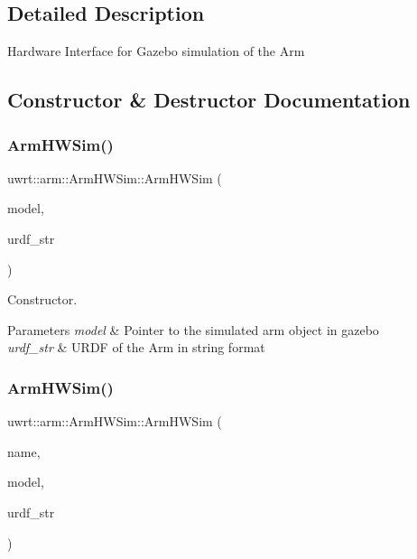 \subsection{Detailed Description}
Hardware Interface for Gazebo simulation of the Arm 

\subsection{Constructor \& Destructor Documentation}
\mbox{\label{classuwrt_1_1arm_1_1_arm_h_w_sim_aaa787422131f1db3f639e5905545a839}} 
\subsubsection{\texorpdfstring{Arm\+H\+W\+Sim()}{ArmHWSim()}\hspace{0.1cm}{\footnotesize\ttfamily [1/2]}}
{\footnotesize\ttfamily uwrt\+::arm\+::\+Arm\+H\+W\+Sim\+::\+Arm\+H\+W\+Sim (\begin{DoxyParamCaption}\item[{gazebo\+::physics\+::\+Model\+Ptr}]{model,  }\item[{const std\+::string \&}]{urdf\+\_\+str }\end{DoxyParamCaption})}



Constructor. 


\begin{DoxyParams}{Parameters}
{\em model} & Pointer to the simulated arm object in gazebo \\
\hline
{\em urdf\+\_\+str} & U\+R\+DF of the Arm in string format \\
\hline
\end{DoxyParams}
\mbox{\label{classuwrt_1_1arm_1_1_arm_h_w_sim_ac0764d307f3b885dccc49c36545dfcd3}} 
\subsubsection{\texorpdfstring{Arm\+H\+W\+Sim()}{ArmHWSim()}\hspace{0.1cm}{\footnotesize\ttfamily [2/2]}}
{\footnotesize\ttfamily uwrt\+::arm\+::\+Arm\+H\+W\+Sim\+::\+Arm\+H\+W\+Sim (\begin{DoxyParamCaption}\item[{const std\+::string \&}]{name,  }\item[{gazebo\+::physics\+::\+Model\+Ptr}]{model,  }\item[{const std\+::string \&}]{urdf\+\_\+str }\end{DoxyParamCaption})}



